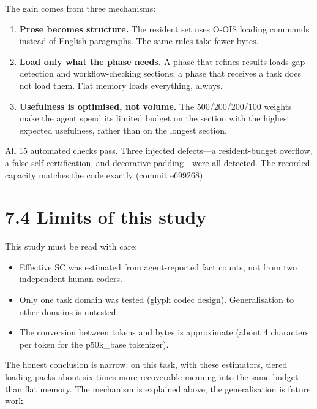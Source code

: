 The gain comes from three mechanisms:

\begin{enumerate}
\item \textbf{Prose becomes structure.} The resident set uses O-OIS loading commands instead of English paragraphs. The same rules take fewer bytes.
\item \textbf{Load only what the phase needs.} A phase that refines results loads gap-detection and workflow-checking sections; a phase that receives a task does not load them. Flat memory loads everything, always.
\item \textbf{Usefulness is optimised, not volume.} The 500/200/200/100 weights make the agent spend its limited budget on the section with the highest expected usefulness, rather than on the longest section.
\end{enumerate}

All 15 automated checks pass. Three injected defects---a resident-budget overflow, a false self-certification, and decorative padding---were all detected. The recorded capacity matches the code exactly (commit e699268).

\section*{7.4 Limits of this study}

This study must be read with care:

\begin{itemize}
\item Effective SC was estimated from agent-reported fact counts, not from two independent human coders.
\item Only one task domain was tested (glyph codec design). Generalisation to other domains is untested.
\item The conversion between tokens and bytes is approximate (about 4 characters per token for the p50k\_base tokenizer).
\end{itemize}

The honest conclusion is narrow: on this task, with these estimators, tiered loading packs about six times more recoverable meaning into the same budget than flat memory. The mechanism is explained above; the generalisation is future work.
